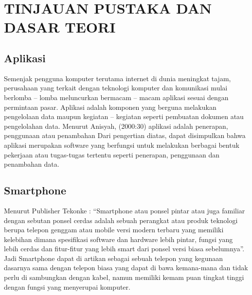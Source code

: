 \documentclass{jtetiproposalskripsi}
\begin{document}
\chapter{TINJAUAN PUSTAKA DAN DASAR TEORI}                

\section{Aplikasi}

Semenjak pengguna komputer terutama internet di dunia meningkat tajam, perusahaan yang terkait dengan teknologi komputer dan komunikasi mulai berlomba – lomba meluncurkan bermacam – macam aplikasi sesuai dengan permintaan pasar. 
Aplikasi adalah komponen yang berguna melakukan pengelolaan data maupun kegiatan – kegiatan seperti pembuatan dokumen atau pengelolahan data.
Menurut Anisyah, (2000:30) aplikasi adalah penerapan,
penggunaan atau penambahan Dari pengertian diatas, dapat disimpulkan bahwa
aplikasi merupakan software yang berfungsi untuk melakukan berbagai bentuk
pekerjaan atau tugas-tugas tertentu seperti penerapan, penggunaan dan
penambahan data.


\section{Smartphone}
Menurut Publisher Tekonke : “Smartphone atau ponsel pintar atau juga familiar dengan sebutan ponsel cerdas adalah sebuah perangkat atau produk teknologi berupa telepon genggam atau mobile versi modern terbaru yang memiliki kelebihan dimana spesifikasi software dan hardware lebih pintar, fungsi yang lebih cerdas dan fitur-fitur yang lebih smart dari ponsel versi biasa sebelumnya”.  
Jadi Smartphone dapat di artikan sebagai sebuah telepon yang kegunaan dasarnya sama dengan telepon biasa yang dapat di bawa kemana-mana dan tidak perlu di sambungkan dengan kabel, namun memiliki kemam puan tingkat tinggi dengan fungsi yang menyerupai komputer.
\end{document}
